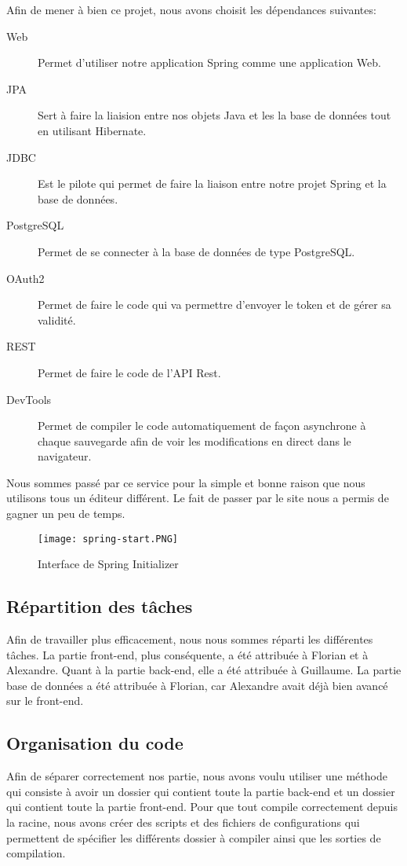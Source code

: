 Afin de mener à bien ce projet, nous avons choisit les dépendances suivantes:

\begin{description}
	\item[Web] Permet d'utiliser notre application Spring comme une application Web.
	\item[JPA] Sert à faire la liaision entre nos objets Java et les la base de données tout en utilisant Hibernate.
	\item[JDBC] Est le pilote qui permet de faire la liaison entre notre projet Spring et la base de données.
	\item[PostgreSQL] Permet de se connecter à la base de données de type PostgreSQL.
	\item[OAuth2] Permet de faire le code qui va permettre d'envoyer le token et de gérer sa validité.
	\item[REST] Permet de faire le code de l'API Rest.
	\item[DevTools] Permet de compiler le code automatiquement de façon asynchrone à chaque sauvegarde afin de voir les modifications en direct dans le navigateur.
\end{description}

Nous sommes passé par ce service pour la simple et bonne raison que nous utilisons tous un éditeur différent. Le fait de passer par le site nous a permis de gagner un peu de temps.

\begin{figure}[ht]
	\centering
	\texttt{[image: spring-start.PNG]}
	\caption{Interface de Spring Initializer}
\end{figure}

\subsection{Répartition des tâches}
Afin de travailler plus efficacement, nous nous sommes réparti les différentes tâches. La partie front-end, plus conséquente, a été attribuée à Florian et à Alexandre. Quant à la partie back-end, elle a été attribuée à Guillaume. La partie base de données a été attribuée à Florian, car Alexandre avait déjà bien avancé sur le front-end.

\subsection{Organisation du code}
Afin de séparer correctement nos partie, nous avons voulu utiliser une méthode qui consiste à avoir un dossier qui contient toute la partie back-end et un dossier qui contient toute la partie front-end. Pour que tout compile correctement depuis la racine, nous avons créer des scripts et des fichiers de configurations qui permettent de spécifier les différents dossier à compiler ainsi que les sorties de compilation.

